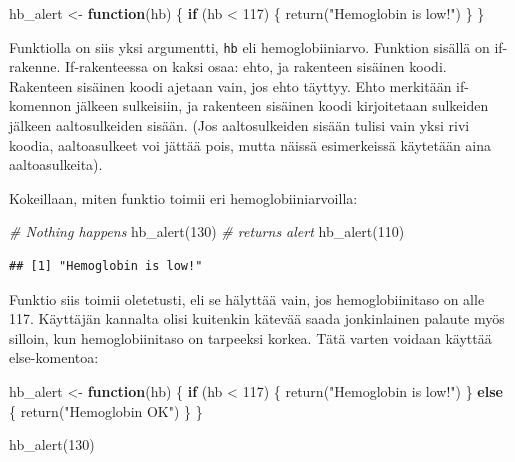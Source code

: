 \documentclass[
]{book}
\newenvironment{Shaded}{\begin{snugshade}}{\end{snugshade}}
\newcommand{\CommentTok}[1]{\textcolor[rgb]{0.56,0.35,0.01}{\textit{#1}}}
\newcommand{\ControlFlowTok}[1]{\textcolor[rgb]{0.13,0.29,0.53}{\textbf{#1}}}
\newcommand{\DecValTok}[1]{\textcolor[rgb]{0.00,0.00,0.81}{#1}}
\newcommand{\FunctionTok}[1]{\textcolor[rgb]{0.00,0.00,0.00}{#1}}
\newcommand{\NormalTok}[1]{#1}
\newcommand{\OtherTok}[1]{\textcolor[rgb]{0.56,0.35,0.01}{#1}}
\newcommand{\SpecialCharTok}[1]{\textcolor[rgb]{0.00,0.00,0.00}{#1}}
\newcommand{\StringTok}[1]{\textcolor[rgb]{0.31,0.60,0.02}{#1}}
\begin{document}
\begin{Shaded}
\begin{Highlighting}[]
\NormalTok{hb\_alert }\OtherTok{\textless{}{-}} \ControlFlowTok{function}\NormalTok{(hb) \{}
  \ControlFlowTok{if}\NormalTok{ (hb }\SpecialCharTok{\textless{}} \DecValTok{117}\NormalTok{) \{}
    \FunctionTok{return}\NormalTok{(}\StringTok{"Hemoglobin is low!"}\NormalTok{)}
\NormalTok{  \}}
\NormalTok{\}}
\end{Highlighting}
\end{Shaded}

Funktiolla on siis yksi argumentti, \texttt{hb} eli hemoglobiiniarvo. Funktion sisällä on if-rakenne. If-rakenteessa on kaksi osaa: ehto, ja rakenteen sisäinen koodi. Rakenteen sisäinen koodi ajetaan vain, jos ehto täyttyy. Ehto merkitään if-komennon jälkeen sulkeisiin, ja rakenteen sisäinen koodi kirjoitetaan sulkeiden jälkeen aaltosulkeiden sisään. (Jos aaltosulkeiden sisään tulisi vain yksi rivi koodia, aaltoasulkeet voi jättää pois, mutta näissä esimerkeissä käytetään aina aaltoasulkeita).

Kokeillaan, miten funktio toimii eri hemoglobiiniarvoilla:

\begin{Shaded}
\begin{Highlighting}[]
\CommentTok{\# Nothing happens}
\FunctionTok{hb\_alert}\NormalTok{(}\DecValTok{130}\NormalTok{)}
\CommentTok{\# returns alert}
\FunctionTok{hb\_alert}\NormalTok{(}\DecValTok{110}\NormalTok{)}
\end{Highlighting}
\end{Shaded}

\begin{verbatim}
## [1] "Hemoglobin is low!"
\end{verbatim}

Funktio siis toimii oletetusti, eli se hälyttää vain, jos hemoglobiinitaso on alle 117. Käyttäjän kannalta olisi kuitenkin kätevää saada jonkinlainen palaute myös silloin, kun hemoglobiinitaso on tarpeeksi korkea. Tätä varten voidaan käyttää else-komentoa:

\begin{Shaded}
\begin{Highlighting}[]
\NormalTok{hb\_alert }\OtherTok{\textless{}{-}} \ControlFlowTok{function}\NormalTok{(hb) \{}
  \ControlFlowTok{if}\NormalTok{ (hb }\SpecialCharTok{\textless{}} \DecValTok{117}\NormalTok{) \{}
    \FunctionTok{return}\NormalTok{(}\StringTok{"Hemoglobin is low!"}\NormalTok{)}
\NormalTok{  \} }\ControlFlowTok{else}\NormalTok{ \{}
    \FunctionTok{return}\NormalTok{(}\StringTok{"Hemoglobin OK"}\NormalTok{)}
\NormalTok{  \}}
\NormalTok{\}}

\FunctionTok{hb\_alert}\NormalTok{(}\DecValTok{130}\NormalTok{)}
\end{Highlighting}
\end{Shaded}
\end{document}
